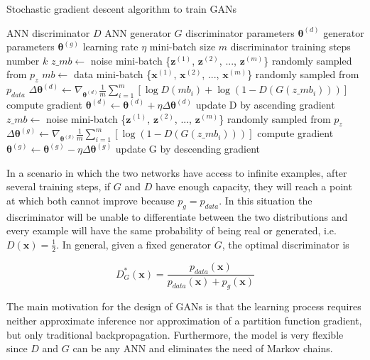 \begin{algorithm}
\caption{Stochastic gradient descent algorithm to train GANs}
\label{alg:sgd_gans}
\begin{algorithmic}[1]
\Require ANN discriminator $D$
\Require ANN generator $G$
\Require discriminator parameters $\bm{\theta}^{(d)}$
\Require generator parameters $\bm{\theta}^{(g)}$
\Require learning rate $\eta$
\Require mini-batch size $m$
\Require discriminator training steps number $k$
        \State $z\_mb \gets$ noise mini-batch \{$\bm{z}^{(1)}$, $\bm{z}^{(2)}$, ..., $\bm{z}^{(m)}$\} randomly sampled from $p_z$
        \State $mb \gets$ data mini-batch \{$\bm{x}^{(1)}$, $\bm{x}^{(2)}$, ..., $\bm{x}^{(m)}$\} randomly sampled from $p_{data}$
        \State $\Delta \bm{\theta}^{(d)} \gets \nabla_{\bm{\theta}^{(d)}} \frac{1}{m} \sum\limits_{i=1}^m [\log D(mb_i) + \log (1 - D(G(z\_mb_i)))]$
        \Comment compute gradient
        \State $\bm{\theta}^{(d)} \gets \bm{\theta}^{(d)} + \eta \Delta \bm{\theta}^{(d)}$ 
        \Comment update D by ascending gradient
    \EndFor
    \State $z\_mb \gets$ noise mini-batch \{$\bm{z}^{(1)}$, $\bm{z}^{(2)}$, ..., $\bm{z}^{(m)}$\} randomly sampled from $p_z$
    \State $\Delta \bm{\theta}^{(g)} \gets \nabla_{\bm{\theta}^{(g)}} \frac{1}{m} \sum\limits_{i=1}^m [\log (1 - D(G(z\_mb_i)))]$
    \Comment compute gradient
    \State $\bm{\theta}^{(g)} \gets \bm{\theta}^{(g)} - \eta \Delta \bm{\theta}^{(g)}$ 
    \Comment update G by descending gradient
\EndWhile
\end{algorithmic}
\end{algorithm}


In a scenario in which the two networks have access to infinite examples, after several training steps, if $G$ and $D$ have enough capacity, they will reach a point at which both cannot improve because $p_g = p_{data}$. In this situation the discriminator will be unable to differentiate between the two distributions and every example will have the same probability of being real or generated, i.e. $D(\bm{x}) = \frac{1}{2}$. In general, given a fixed generator $G$, the optimal discriminator is

\begin{equation}
\label{perfect_gans_D}
D^*_G(\bm{x}) = \frac{p_{data}(\bm{x})}{p_{data}(\bm{x}) + p_g(\bm{x})}
\end{equation}

The main motivation for the design of GANs is that the learning process
requires neither approximate inference nor approximation of a partition function gradient, but only traditional backpropagation. Furthermore, the model is very flexible since $D$ and $G$ can be any ANN and eliminates the need of Markov chains.

